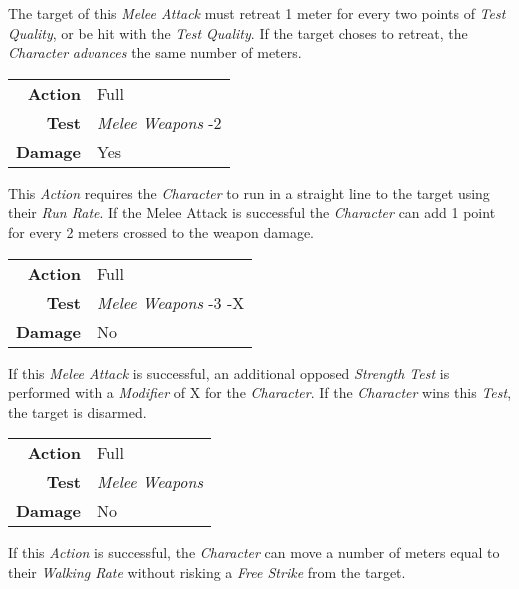 \hfill

The target of this \emph{Melee Attack} must retreat 1 meter for every two points
of \emph{Test Quality}, or be hit with the \emph{Test Quality}. If the target
choses to retreat, the \emph{Character} \emph{advances} the same number of meters.


\begin{tabular}{rl}
    \textbf{Action} & Full                    \\
    \textbf{Test}   & \emph{Melee Weapons} -2 \\
    \textbf{Damage} & Yes                     \\
\end{tabular}

\hfill

This \emph{Action} requires the \emph{Character} to run in a straight line to the
target using their \emph{Run Rate}. If the Melee Attack is successful the
\emph{Character} can add 1 point for every 2 meters crossed to the weapon damage.



\begin{tabular}{rl}
    \textbf{Action} & Full                       \\
    \textbf{Test}   & \emph{Melee Weapons} -3 -X \\
    \textbf{Damage} & No                         \\
\end{tabular}

\hfill

If this \emph{Melee Attack} is successful, an additional opposed
\emph{Strength Test} is performed with a \emph{Modifier} of X for
the \emph{Character}. If the \emph{Character} wins this \emph{Test}, the target
is disarmed.


\begin{tabular}{rl}
    \textbf{Action} & Full                 \\
    \textbf{Test}   & \emph{Melee Weapons} \\
    \textbf{Damage} & No                   \\
\end{tabular}

\hfill

If this \emph{Action} is successful, the \emph{Character} can move a number of
meters equal to their \emph{Walking Rate} without risking a \emph{Free Strike}
from the target.

